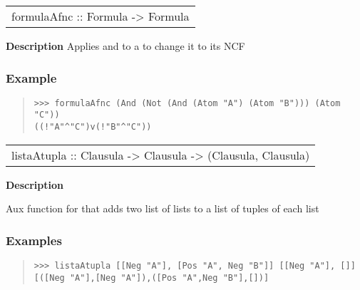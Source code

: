 \begin{haddockdesc}
\item[\begin{tabular}{@{}l}
formulaAfnc :: Formula -> Formula
\end{tabular}]
{\haddockbegindoc
\textbf{Description}
Applies  and  to a  to change it to its NCF\par
\subsubsection*{\textbf{Example}}
\begin{quote}
{\haddockverb\begin{verbatim}
>>> formulaAfnc (And (Not (And (Atom "A") (Atom "B"))) (Atom "C"))
((!"A"^"C")v(!"B"^"C"))

\end{verbatim}}
\end{quote}}
\end{haddockdesc}
\begin{haddockdesc}
\item[\begin{tabular}{@{}l}
listaAtupla :: {\char 91}Clausula{\char 93} -> {\char 91}Clausula{\char 93} -> {\char 91}(Clausula, Clausula){\char 93}
\end{tabular}]
{\haddockbegindoc
\textbf{Description}\par
Aux function for  that adds two list of lists to a list of tuples of each list\par
\subsubsection*{\textbf{Examples}}
\begin{quote}
{\haddockverb\begin{verbatim}
>>> listaAtupla [[Neg "A"], [Pos "A", Neg "B"]] [[Neg "A"], []]
[([Neg "A"],[Neg "A"]),([Pos "A",Neg "B"],[])]

\end{verbatim}}
\end{quote}}
\end{haddockdesc}
